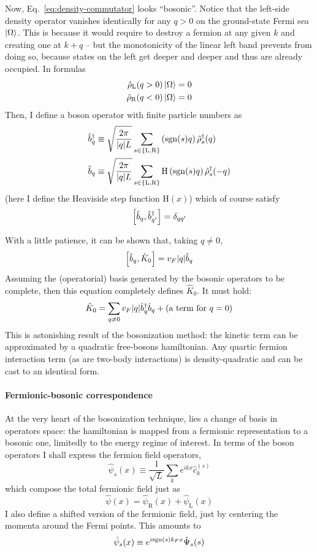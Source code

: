 Now, Eq.~\eqref{eq:density-commutator} looks ``bosonic''. Notice that the left-side density operator vanishes identically for any $q>0$ on the ground-state Fermi sea $\ket{\Omega}$. This is because it would require to destroy a fermion at any given $k$ and creating one at $k+q$ -- but the monotonicity of the linear left band prevents from doing so, because states on the left get deeper and deeper and thus are already occupied. In formulas
\[
\begin{aligned}
	\hat \rho_\mathrm{L} (q>0) \ket{\Omega} &= 0 \\
	\hat \rho_\mathrm{R} (q<0) \ket{\Omega} &= 0
\end{aligned}
\]
Then, I define a boson operator with finite particle numbers as
\[
\begin{aligned}
	\hat b_q^\dagger &\equiv \sqrt{\frac{2\pi}{\abs{q}L}} \sum_{s \in \left\{\mathrm L, \mathrm R\right\}}  \left(\mathrm{sgn}(s) q\right) \hat \rho_s^\dagger (q) \\
	\hat b_q &\equiv \sqrt{\frac{2\pi}{\abs{q}L}} \sum_{s \in \left\{\mathrm L, \mathrm R\right\}} \mathrm{H} \left(\mathrm{sgn}(s) q\right) \hat \rho_s^\dagger (-q)
\end{aligned}
\]
(here I define the Heaviside step function $\mathrm{H}(x)$) which of course satisfy
\[
	\comm{\hat b_q}{\hat b_{q'}^\dagger} = \delta_{qq'}
\]

With a little patience, it can be shown that, taking $q \neq 0$,
\begin{equation}\label{eq:boson-hamiltonian-commutator}
	\comm{\hat b_q}{\hat K_0} = v_F \abs{q} \hat b_q
\end{equation}
Assuming the (operatorial) basis generated by the bosonic operators to be complete, then this equation completely defines $\hat K_0$. It must hold:
\[
	\hat K_0 = \sum_{q \neq 0} v_F \abs{q} \hat b_q^\dagger \hat b_q + (\text{a term for $q=0$})
\]
This is astonishing result of the bosonization method: the kinetic term can be approximated by a quadratic free-bosons hamiltonian. Any quartic fermion interaction term (as are two-body interactions) is density-quadratic and can be cast to an identical form.

\paragraph{Fermionic-bosonic correspondence}
At the very heart of the bosonization technique, lies a change of basis in operators space: the hamiltonian is mapped from a fermionic representation to a bosonic one, limitedly to the energy regime of interest. In terms of the boson operators I shall express the fermion field operators,
\[
	\hat \psi_s (x) \equiv \frac{1}{\sqrt{L}} \sum_k e^{ikx} \hat c_k^{(s)}
\]
which compose the total fermionic field just as
\[
	\hat \psi(x) = \hat \psi_\mathrm{R}(x) + \hat \psi_\mathrm{L}(x)
\]
I also define a shifted version of the fermionic field, just by centering the momenta around the Fermi points. This amounts to
\begin{equation}\label{eq:shifted-fermionic-fields-definition}
	\hat \psi_s (x) \equiv e^{i \mathrm{sgn}(s) k_F x} \hat \Psi_s (s)
\end{equation}

